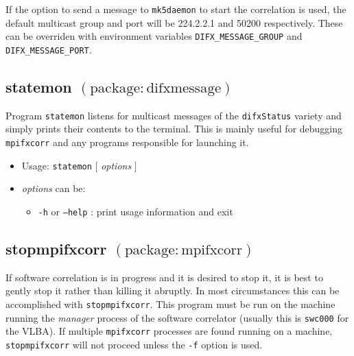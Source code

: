 If the option to send a message to {\tt mk5daemon} to start the correlation is used, the default multicast group and port will be 224.2.2.1 and 50200 respectively.
These can be overriden with environment variables {\tt DIFX\_MESSAGE\_GROUP} and {\tt DIFX\_MESSAGE\_PORT}.







\subsection{statemon {\small $\mathrm{(package: difxmessage)}$}} \label{sec:statemon} 

Program {\tt statemon} listens for multicast messages of the {\tt difxStatus} variety and simply prints their contents to the terminal.
This is mainly useful for debugging {\tt mpifxcorr} and any programs responsible for launching it.

\begin{itemize}
\item[] Usage: {\tt statemon} $[$ {\em options} $]$ 
\item[] {\em options} can be:
\begin{itemize}
\item[] {\tt -h} or {\tt --help} : print usage information and exit
\end{itemize}
\end{itemize}











\subsection{stopmpifxcorr {\small $\mathrm{(package: mpifxcorr)}$}} \label{sec:stopmpifxcorr}

If software correlation is in progress and it is desired to stop it, it is best to gently stop it rather than killing it abruptly.
In most circumstances this can be accomplished with {\tt stopmpifxcorr}.
This program must be run on the machine running the {\em manager} process of the software correlator (usually this is {\tt swc000} for the VLBA).
If multiple {\tt mpifxcorr} processes are found running on a machine, {\tt stopmpifxcorr} will not proceed unless the
{\tt -f} option is used.

